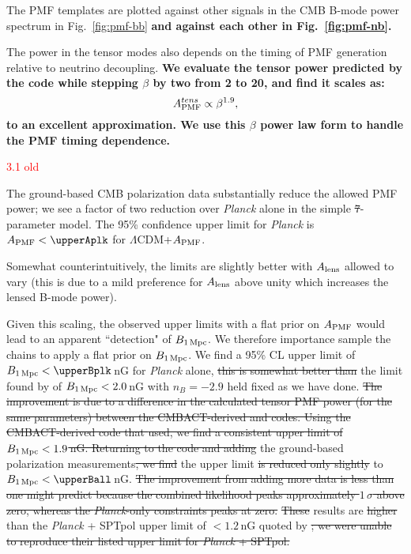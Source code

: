 \documentclass{article}
\newcommand{\apmf}{\ensuremath{A_{\rm PMF}}}
\newcommand{\bpmf}{\ensuremath{B_{\rm 1\,Mpc}}}
\newcommand{\alens}{\ensuremath{A_{\rm lens}}}
\newcommand{\lcdm}{\ensuremath{\Lambda}CDM}
\newcommand{\be}{\begin{equation}}
\newcommand{\ee}{\end{equation}}
\newcommand{\planck}{{\sl Planck}}
\newcommand{\sptpol}{SPTpol}
\newcommand{\changed}[1]{\textcolor{Red}{#1}}
\newcommand{\removed}[1]{\st{#1}}
\newcommand{\added}[1]{\textbf{#1}}
\begin{document}
The PMF templates are plotted against other signals in the CMB B-mode power spectrum in Fig.~\ref{fig:pmf-bb} \added{and against each other in Fig.~\ref{fig:pmf-nb}. }

The power in the tensor modes also depends on the timing of PMF generation relative to neutrino decoupling. 
\added{We evaluate the tensor power predicted by the \citet{zucca16} code while stepping $\beta$ by two from 2 to 20, and find it scales as:
\be \label{eqn:betascaling}
\apmf^{tens} \propto \beta^{1.9},
\ee
to an excellent approximation. 
We use this $\beta$ power law form to handle the PMF timing dependence. }

\changed{3.1 old}

The ground-based CMB polarization data  substantially reduce the allowed PMF power; we see a factor of two reduction over \planck{} alone in the simple \removed{7}-parameter model. 
The 95\% confidence upper limit for \planck{} is $\apmf <  \upperAplk$ for \lcdm{}+\apmf{}.

Somewhat counterintuitively, the limits are slightly better with \alens{} allowed to vary (this is due to a mild preference for \alens{} above unity which increases the lensed B-mode power). 

Given this scaling, the observed upper limits with a flat prior on \apmf{} would lead to an apparent ``detection" of \bpmf. 
We therefore importance sample the chains to apply a flat prior on \bpmf. 
We find a 95\% CL upper limit of $\bpmf < \upperBplk$\,nG for \planck{} alone,
\removed{this is somewhat better than} the limit found by \citet{planck15-19} of $\bpmf < 2.0$\,nG with $n_B=-2.9$ held fixed as we have done. 
\removed{The improvement is due to a difference in the calculated tensor PMF power (for the same parameters) between the CMBACT-derived and \citet{zucca16} codes. 
Using the CMBACT-derived code that \citet{planck15-19} used, we find a consistent upper limit of $\bpmf < 1.9$\,nG. 
Returning to the  \citet{zucca16} code and adding} the ground-based polarization measurements\removed{, we find} the upper limit \removed{is  reduced only slightly} to $\bpmf < \upperBall$\,nG. 
\removed{The improvement from adding more data is less than one might predict because the combined likelihood peaks approximately $1\,\sigma$ above zero, whereas the \planck{}-only constraints peaks at zero. }
\removed{These} results are \removed{higher} than the \planck{} + \sptpol{} upper limit of $<1.2\,$nG quoted by \citet{zucca16}\removed{; we were unable to reproduce their listed upper limit for \planck{} + \sptpol{}.}
\end{document}
